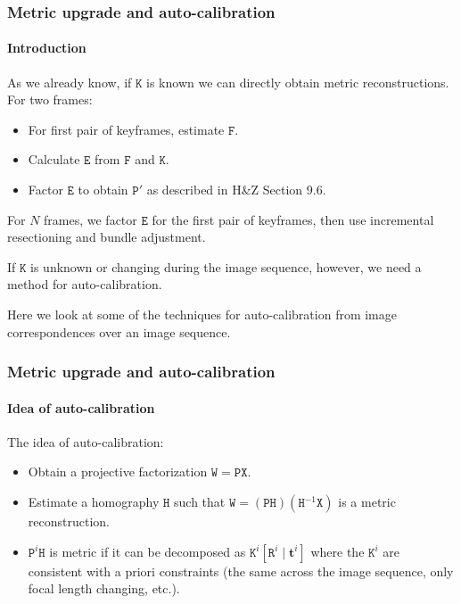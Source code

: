 \documentclass[aspectratio=169]{beamer}
\renewcommand{\vec}[1]{\boldsymbol{#1}}
\newcommand{\mat}[1]{\mathtt{#1}}
\begin{document}
\begin{frame}
\frametitle{Metric upgrade and auto-calibration}
\framesubtitle{Introduction}

As we already know, if $\mat{K}$ is known we can directly obtain
metric reconstructions. For two frames:
\begin{itemize}
\item For first pair of keyframes, estimate $\mat{F}$.
\item Calculate $\mat{E}$ from $\mat{F}$ and $\mat{K}$.
\item Factor $\mat{E}$ to obtain $\mat{P}'$ as described in H\&Z
  Section 9.6.
\end{itemize}

For $N$ frames, we factor $\mat{E}$ for the first pair of keyframes,
then use incremental resectioning and bundle adjustment.

\medskip

If $\mat{K}$ is \alert{unknown} or \alert{changing} during the image
sequence, however, we need a method for \alert{auto-calibration}.

\medskip

Here we look at some of the techniques for auto-calibration from
image correspondences over an image sequence.

\end{frame}


\begin{frame}
\frametitle{Metric upgrade and auto-calibration}
\framesubtitle{Idea of auto-calibration}

The idea of auto-calibration:
\begin{itemize}
\item Obtain a projective factorization $\mat{W}=\mat{P}\mat{X}$.
\item Estimate a homography $\mat{H}$ such that
  $\mat{W}=(\mat{P}\mat{H})(\mat{H}^{-1}\mat{X})$ is a metric
  reconstruction.
\item $\mat{P}^i\mat{H}$ is metric if it can be decomposed as
  $\mat{K}^i[\mat{R}^i \mid \vec{t}^i]$ where the $\mat{K}^i$
  are consistent with a priori constraints (the same across the
  image sequence, only focal length changing, etc.).
\end{itemize}

\end{frame}
\end{document}
